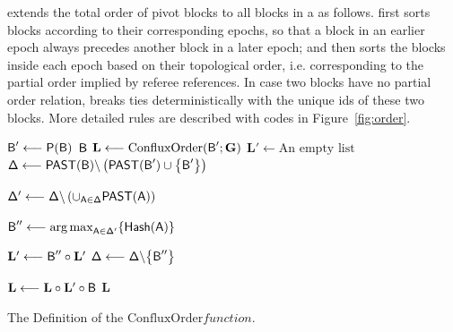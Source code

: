 {\name} extends the total order of pivot blocks to all blocks in a \tg as follows.
{\name} first sorts blocks according to their corresponding epochs, so that a block in an earlier epoch always precedes another block in a later epoch;
and then {\name} sorts the blocks inside each epoch based on their topological order, i.e. corresponding to the partial order implied by referee references.
In case two blocks have no partial order relation, {\name} breaks ties deterministically with the unique ids of these two blocks. 
{More detailed rules are described with codes in Figure~\ref{fig:order}.}

\begin{algorithm}[!htb]
	\small
	\SetNlSty{}{}{}
	\DontPrintSemicolon
	\let\oldnl\nl%
	\newcommand{\nonl}{\renewcommand{\nl}{\let\nl\oldnl}}%
	
	$\textsf{B}' \longleftarrow \mathsf{P}(\textsf{B})$\;
	 {
		\Return $\textsf{B}$\;
	}
	$\mathbf{L} \longleftarrow \mathrm{ConfluxOrder}( \textsf{B}';\textbf{G})$\;
	$\mathbf{L}' \longleftarrow \text{An empty list}$\;
	$\mathsf{\Delta} \longleftarrow \mathsf{PAST}(\textsf{B}) \backslash \left(\mathsf{PAST}(\textsf{B}') \cup {\left \{{\textsf{B}'} \right \}}\right)$\;
	\While {$\mathsf{\Delta} \neq \emptyset$} {
		$\mathsf{\Delta}' \longleftarrow \mathsf{\Delta} \backslash\left(\cup_{\textsf{A} \in \mathsf{\Delta}} \mathsf{PAST}(\textsf{A}) \right)$\;

		
		$\textsf{B}''\longleftarrow {\arg\max}_{\textsf{A}\in\mathsf{\Delta'}}{\left \{{\mathsf{Hash}(\textsf{A})} \right \}}$\;

		$\mathbf{L}' \longleftarrow \textsf{B}'' \circ \mathbf{L}'$ \;
		$\mathsf{\Delta} \longleftarrow \mathsf{\Delta} \backslash {\left \{{\textsf{B}''} \right \}}$\;
	}
	$\mathbf{L}  \longleftarrow \mathbf{L} \circ \mathbf{L}' \circ \textsf{B}$\;
	\Return $\mathbf{L}$\;
	\caption{The Definition of the $\mathrm{ConfluxOrder} function$.}
	\label{fig:order}
\end{algorithm}

